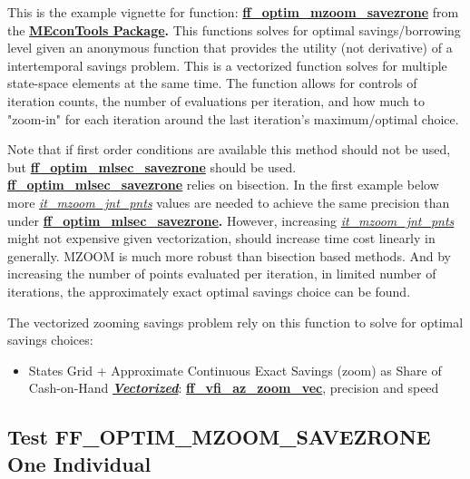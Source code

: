 \documentclass[
]{book}
\providecommand{\tightlist}{%
  \setlength{\itemsep}{0pt}\setlength{\parskip}{0pt}}
\begin{document}
This is the example vignette for function:
\href{https://github.com/FanWangEcon//MEconTools/blob/master/MEconTools/optim/ff_optim_mzoom_savezrone.m}{\textbf{ff\_optim\_mzoom\_savezrone}}
from the \href{https://fanwangecon.github.io/MEconTools/}{\textbf{MEconTools
Package}}\textbf{.} This
functions solves for optimal savings/borrowing level given an anonymous
function that provides the utility (not derivative) of a intertemporal
savings problem. This is a vectorized function solves for multiple
state-space elements at the same time. The function allows for controls
of iteration counts, the number of evaluations per iteration, and how
much to "zoom-in" for each iteration around the last iteration's
maximum/optimal choice.

Note that if first order conditions are available this method should not
be used, but
\href{https://github.com/FanWangEcon//MEconTools/blob/master/MEconTools/optim/ff_optim_mlsec_savezrone.m}{\textbf{ff\_optim\_mlsec\_savezrone}}
should be used.
\href{https://github.com/FanWangEcon//MEconTools/blob/master/MEconTools/optim/ff_optim_mlsec_savezrone.m}{\textbf{ff\_optim\_mlsec\_savezrone}}
relies on bisection. In the first example below more
\underline{\emph{it\_mzoom\_jnt\_pnts}} values are needed to achieve the same
precision than under
\href{https://github.com/FanWangEcon//MEconTools/blob/master/MEconTools/optim/ff_optim_mlsec_savezrone.m}{\textbf{ff\_optim\_mlsec\_savezrone}}\textbf{.}
However, increasing \underline{\emph{it\_mzoom\_jnt\_pnts}} might not expensive given
vectorization, should increase time cost linearly in generally. MZOOM is
much more robust than bisection based methods. And by increasing the
number of points evaluated per iteration, in limited number of
iterations, the approximately exact optimal savings choice can be found.

The vectorized zooming savings problem rely on this function to solve
for optimal savings choices:

\begin{itemize}
\tightlist
\item
  States Grid + Approximate Continuous Exact Savings (zoom) as Share
  of Cash-on-Hand \underline{\textbf{\emph{Vectorized}}}:
  \href{https://github.com/FanWangEcon/MEconTools/blob/master/MEconTools/vfi/ff_vfi_az_zoom_vec.m}{\textbf{ff\_vfi\_az\_zoom\_vec}},
  precision and speed
\end{itemize}

\hypertarget{test-ff_optim_mzoom_savezrone-one-individual}{%
\subsection{Test FF\_OPTIM\_MZOOM\_SAVEZRONE One Individual}\label{test-ff_optim_mzoom_savezrone-one-individual}}
\end{document}
